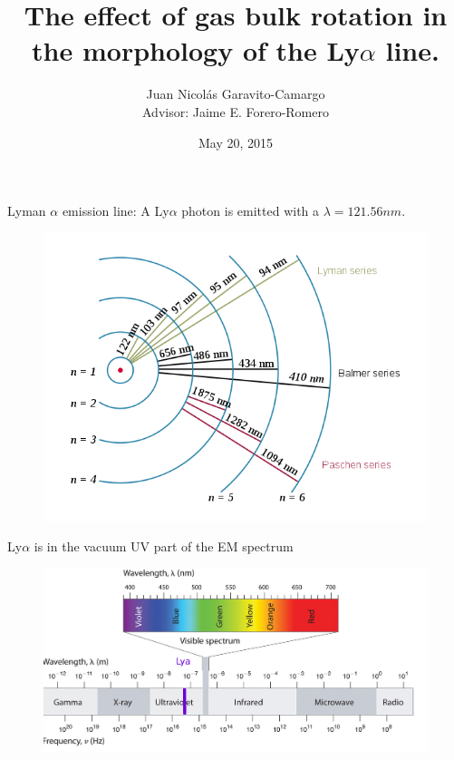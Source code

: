 \documentclass{beamer}
\title[Make a LaTeX presentation using Beamer]{The effect of gas bulk 
rotation in the morphology of the Ly$\alpha$ line.}
\author{Juan Nicol\'as Garavito-Camargo \\ Advisor: Jaime E. Forero-Romero}
\institute{Universidad de los Andes, Bogot\'a, Colombia}
\date{May 20, 2015}
\begin{document}


\begin{frame}{Lyman $\alpha$ emission line:}
A Ly$\alpha$ photon is emitted with a $\lambda= 121.56 nm$.
\begin{figure}
\includegraphics[scale=0.4]{Figures/Hydrogen_transitions.png}
\end{figure}
\end{frame}

\begin{frame}{Ly$\alpha$ is in the vacuum UV part of the EM spectrum}
\begin{figure}
\centering
\includegraphics[scale=0.18]{Figures/em.jpg}
\end{figure}
\end{frame}
\end{document}
